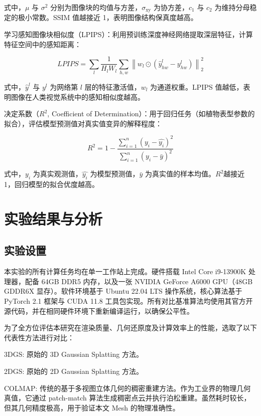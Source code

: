 \documentclass[preprint,12pt]{elsarticle}
\begin{document}
式中，$\mu$ 与 ${\sigma}^{2}$ 分别为图像块的均值与方差，${\sigma}_{\mathrm{xy}}$ 为协方差，${c}_{1}$ 与 ${c}_{2}$ 为维持分母稳定的极小常数。SSIM 值越接近 1，表明图像结构保真度越高。

学习感知图像块相似度（LPIPS）：利用预训练深度神经网络提取深层特征，计算特征空间中的感知距离：

\begin{equation}
LPIPS=\sum_{l}\frac{1}{H_{l}W_{l}}\sum_{h,w}\left\|w_{l}\odot\left(\hat{y}_{hw}^{l}-y_{hw}^{l}\right)\right\|_{2}^{2}
\end{equation}

式中，$\hat{y}^{l}$ 与 $y^{l}$ 为网络第 $l$ 层的特征激活值，${w}_{l}$ 为通道权重。LPIPS 值越低，表明图像在人类视觉系统中的感知相似度越高。

决定系数（${R}^{2}$, Coefficient of Determination）：用于回归任务（如植物表型参数的拟合），评估模型预测值对真实值变异的解释程度：

\begin{equation}
{R}^{2}=1-\frac{\sum_{i=1}^{n} {\left({y}_{i}-\hat{{y}_{i}}\right)}^{2}}{\sum_{i=1}^{n} {\left({y}_{i}-\bar{y}\right)}^{2}}
\end{equation}

式中，${y}_{i}$ 为真实观测值，$\hat{{y}_{i}}$ 为模型预测值，$\bar{y}$ 为真实值的样本均值。${R}^{2}$越接近 1，回归模型的拟合优度越高。

\section{实验结果与分析}

\subsection{实验设置}

本实验的所有计算任务均在单一工作站上完成。硬件搭载 Intel Core i9-13900K 处理器，配备 64GB DDR5 内存，以及一张 NVIDIA GeForce A6000 GPU（48GB GDDR6X 显存）。软件环境基于 Ubuntu 22.04 LTS 操作系统，核心算法基于 PyTorch 2.1 框架与 CUDA 11.8 工具包实现。所有对比基准算法均使用其官方开源代码，并在相同硬件环境下重新编译运行，以确保公平性。

为了全方位评估本研究在渲染质量、几何还原度及计算效率上的性能，选取了以下代表性方法进行对比：

3DGS: 原始的 3D Gaussian Splatting 方法。

2DGS: 原始的 2D Gaussian Splatting 方法。

COLMAP: 传统的基于多视图立体几何的稠密重建方法。作为工业界的物理几何真值，它通过 patch-match 算法生成稠密点云并执行泊松重建。虽然耗时较长，但其几何精度极高，用于验证本文 Mesh 的物理准确性。
\end{document}

